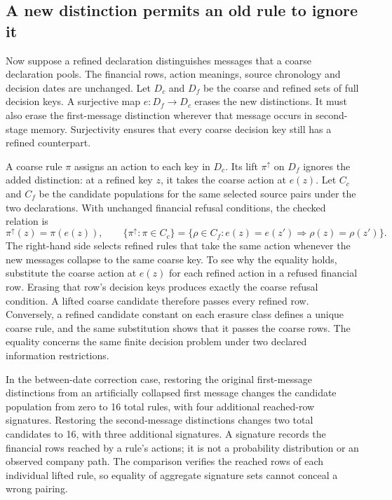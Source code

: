 \subsection{A new distinction permits an old rule to ignore it}

Now suppose a refined declaration distinguishes messages that a coarse declaration pools. The financial rows, action meanings, source chronology and decision dates are unchanged. Let $D_c$ and $D_f$ be the coarse and refined sets of full decision keys. A surjective map $e:D_f\to D_c$ erases the new distinctions. It must also erase the first-message distinction wherever that message occurs in second-stage memory. Surjectivity ensures that every coarse decision key still has a refined counterpart.

A coarse rule $\pi$ assigns an action to each key in $D_c$. Its lift $\pi^{\uparrow}$ on $D_f$ ignores the added distinction: at a refined key $z$, it takes the coarse action at $e(z)$. Let $C_c$ and $C_f$ be the candidate populations for the same selected source pairs under the two declarations. With unchanged financial refusal conditions, the checked relation is
\begin{equation}
 \pi^{\uparrow}(z)=\pi(e(z)),\qquad
 \{\pi^{\uparrow}:\pi\in C_c\}
 =\{\rho\in C_f:e(z)=e(z')\Rightarrow\rho(z)=\rho(z')\}.
 \label{eq:joint-observation-lift}
\end{equation}
The right-hand side selects refined rules that take the same action whenever the new messages collapse to the same coarse key. To see why the equality holds, substitute the coarse action at $e(z)$ for each refined action in a refused financial row. Erasing that row's decision keys produces exactly the coarse refusal condition. A lifted coarse candidate therefore passes every refined row. Conversely, a refined candidate constant on each erasure class defines a unique coarse rule, and the same substitution shows that it passes the coarse rows. The equality concerns the same finite decision problem under two declared information restrictions.

In the between-date correction case, restoring the original first-message distinctions from an artificially collapsed first message changes the candidate population from zero to 16 total rules, with four additional reached-row signatures. Restoring the second-message distinctions changes two total candidates to 16, with three additional signatures. A signature records the financial rows reached by a rule's actions; it is not a probability distribution or an observed company path. The comparison verifies the reached rows of each individual lifted rule, so equality of aggregate signature sets cannot conceal a wrong pairing.


